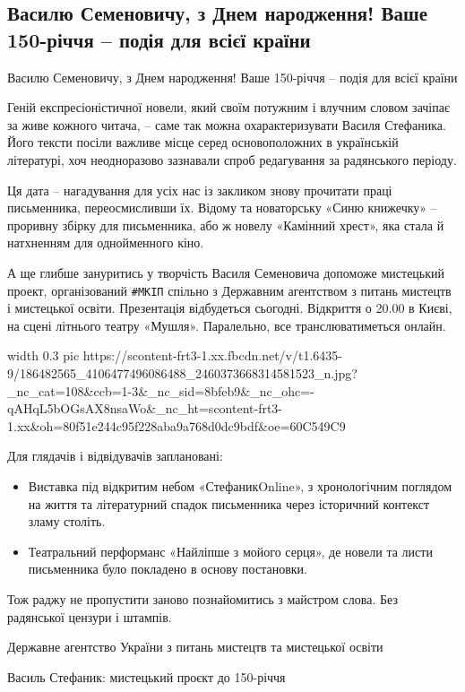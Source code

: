  
 
 
 
 

\subsection{Василю Семеновичу, з Днем народження! Ваше 150-річчя – подія для всієї країни}

Василю Семеновичу, з Днем народження! Ваше 150-річчя – подія для всієї країни

Геній експресіоністичної новели, який своїм потужним і влучним словом зачіпає
за живе кожного читача, – саме так можна охарактеризувати Василя Стефаника.
Його тексти посіли важливе місце серед основоположних в українській літературі,
хоч неодноразово зазнавали спроб редагування за радянського періоду.

Ця дата – нагадування для усіх нас із закликом знову прочитати праці
письменника, переосмисливши їх. Відому та новаторську «Синю книжечку» –
проривну збірку для письменника, або ж новелу «Камінний хрест», яка стала й
натхненням для однойменного кіно. 

А ще глибше зануритись у творчість Василя Семеновича допоможе мистецький
проект, організований \verb|#МКІП| спільно з Державним агентством з питань мистецтв і
мистецької освіти. Презентація відбудеться сьогодні. Відкриття о 20.00 в Києві,
на сцені літнього театру «Мушля». Паралельно, все транслюватиметься онлайн. 

\ifcmt
  width 0.3
  pic https://scontent-frt3-1.xx.fbcdn.net/v/t1.6435-9/186482565_4106477496086488_2460373668314581523_n.jpg?_nc_cat=108&ccb=1-3&_nc_sid=8bfeb9&_nc_ohc=-qAHqL5bOGsAX8nsaWo&_nc_ht=scontent-frt3-1.xx&oh=80f51e244c95f228aba9a768d0dc9bdf&oe=60C549C9
\fi

Для глядачів і відвідувачів заплановані:

\begin{itemize}
  
\item Виставка під відкритим небом «СтефаникOnline», з хронологічним поглядом на життя та літературний спадок письменника через історичний контекст зламу століть.

\item Театральний перформанс «Найліпше з мойого серця», де новели та листи
        письменника було покладено в основу постановки.
\end{itemize}

Тож раджу не пропустити заново познайомитись з майстром слова. Без радянської цензури і штампів.

Державне агентство України з питань мистецтв та мистецької освіти

Василь Стефаник: мистецький проєкт до 150-річчя
